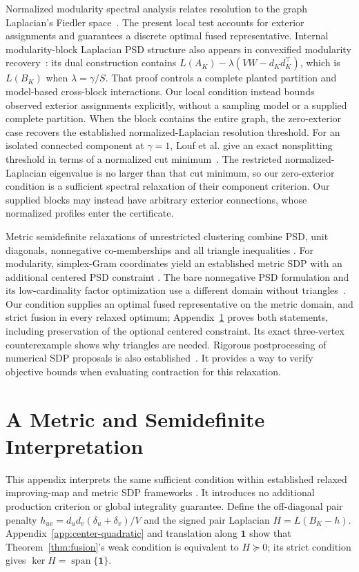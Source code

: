 \documentclass[sigconf,anonymous,review]{acmart}
\newcommand{\1}{\mathbf{1}}
\begin{document}
Normalized modularity spectral analysis relates resolution to the graph
Laplacian's Fiedler space~\cite{floros2023fiedler}. The present local test
accounts for exterior assignments and guarantees a discrete optimal fused
representative.
Internal modularity-block Laplacian PSD structure also appears in convexified
modularity recovery~\cite{chen2018convexified}: its dual construction contains
$L(A_K)-\lambda(VW-d_Kd_K^\top)$, which is $L(B_K)$ when
$\lambda=\gamma/S$. That proof controls a complete planted partition and
model-based cross-block interactions. Our local condition instead bounds
observed exterior assignments explicitly, without a sampling model or a
supplied complete partition. When the block contains the entire graph, the
zero-exterior case recovers the
established normalized-Laplacian resolution threshold.
For an isolated connected component at $\gamma=1$, Louf et al. give an exact nonsplitting
threshold in terms of a normalized cut minimum~\cite{louf2024expansion}.
The restricted normalized-Laplacian eigenvalue is no larger than that cut
minimum, so our zero-exterior condition is a sufficient spectral relaxation
of their component criterion. Our supplied blocks may instead have arbitrary
exterior connections, whose normalized profiles enter the certificate.

Metric semidefinite relaxations of unrestricted clustering combine PSD,
unit diagonals, nonnegative co-memberships and all triangle inequalities
\cite{mathieu2010correlation}. For modularity, simplex-Gram coordinates
yield an established metric SDP with an additional centered PSD constraint
\cite{hildebrand2008convex}. The bare nonnegative PSD formulation and its
low-cardinality factor optimization use a different domain without
triangles~\cite{wang2020community}. Our condition supplies an optimal fused
representative on the metric domain, and strict fusion in every relaxed
optimum; Appendix~\ref{app:relaxation} proves both statements, including
preservation of the optional centered constraint. Its exact three-vertex
counterexample shows why triangles are needed. Rigorous postprocessing
of numerical SDP proposals is also established~\cite{jansson2008rigorous}.
It provides a way to verify objective bounds when evaluating contraction
for this relaxation.

\section{A Metric and Semidefinite Interpretation}\label{app:relaxation}
This appendix interprets the same sufficient condition within established
relaxed improving-map and metric SDP frameworks
\cite{shekhovtsov2014persistency,mathieu2010correlation,hildebrand2008convex}. It introduces no
additional production criterion or global integrality guarantee.
Define the off-diagonal pair penalty
$h_{uv}=d_ud_v(\delta_u+\delta_v)/V$ and the signed pair Laplacian
$H=L(B_K-h)$. Appendix~\ref{app:center-quadratic} and translation along $\1$ show that
Theorem~\ref{thm:fusion}'s weak condition is equivalent to $H\succeq0$;
its strict condition gives $\ker H=\operatorname{span}\{\1\}$.
\end{document}
